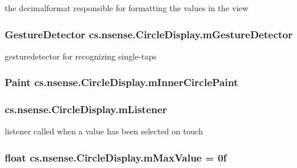 the decimalformat responsible for formatting the values in the view \hypertarget{classcs_1_1nsense_1_1_circle_display_a9adbd13c9a664ea39e216969aae56cca}{
\subsubsection[{m\-Gesture\-Detector}]{\setlength{\rightskip}{0pt plus 5cm}Gesture\-Detector cs.\-nsense.\-Circle\-Display.\-m\-Gesture\-Detector\hspace{0.3cm}{\ttfamily [private]}}}\label{classcs_1_1nsense_1_1_circle_display_a9adbd13c9a664ea39e216969aae56cca}
gesturedetector for recognizing single-\/taps \hypertarget{classcs_1_1nsense_1_1_circle_display_a4d2b08f5d5d7a65d6099a5b2e8368112}{
\subsubsection[{m\-Inner\-Circle\-Paint}]{\setlength{\rightskip}{0pt plus 5cm}Paint cs.\-nsense.\-Circle\-Display.\-m\-Inner\-Circle\-Paint\hspace{0.3cm}{\ttfamily [private]}}}\label{classcs_1_1nsense_1_1_circle_display_a4d2b08f5d5d7a65d6099a5b2e8368112}
\hypertarget{classcs_1_1nsense_1_1_circle_display_adae4901839766d131af8bf6f4dc85bd9}{
\subsubsection[{m\-Listener}]{ cs.\-nsense.\-Circle\-Display.\-m\-Listener\hspace{0.3cm}{\ttfamily [private]}}}\label{classcs_1_1nsense_1_1_circle_display_adae4901839766d131af8bf6f4dc85bd9}
listener called when a value has been selected on touch \hypertarget{classcs_1_1nsense_1_1_circle_display_aeec061c6a120fbc4cb6751f45056bf06}{
\subsubsection[{m\-Max\-Value}]{\setlength{\rightskip}{0pt plus 5cm}float cs.\-nsense.\-Circle\-Display.\-m\-Max\-Value = 0f\hspace{0.3cm}{\ttfamily [private]}}}\label{classcs_1_1nsense_1_1_circle_display_aeec061c6a120fbc4cb6751f45056bf06}
